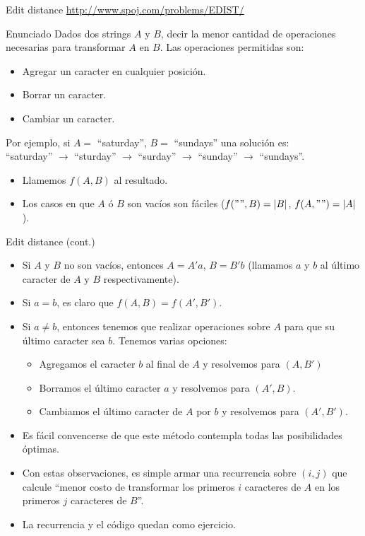 \documentclass{beamer}
\begin{document}
\begin{frame}{Edit distance}
\url{http://www.spoj.com/problems/EDIST/}
\begin{block}{Enunciado}
Dados dos strings $A$ y $B$, decir la menor cantidad de operaciones necesarias para transformar $A$ en $B$. Las operaciones permitidas son:
\begin{itemize}
\item
Agregar un caracter en cualquier posici\'on.
\item
Borrar un caracter.
\item
Cambiar un caracter.
\end{itemize}
Por ejemplo, si $A =$ ``saturday'', $B =$ ``sundays'' una soluci\'on es:\\
``saturday'' $\rightarrow$ ``sturday'' $\rightarrow$ ``surday''  $\rightarrow$ ``sunday'' $\rightarrow$ ``sundays''.
\end{block}
\begin{itemize}
\item
Llamemos $f(A,B)$ al resultado.
\item
Los casos en que $A$ \'o $B$ son vac\'ios son f\'aciles ($f("",B) = |B|$, $f(A,"") = |A|$).
\end{itemize}
\end{frame}
\begin{frame}{Edit distance (cont.)}
\begin{itemize}
\item
Si $A$ y $B$ no son vac\'ios, entonces $A = A'a$, $B = B'b$ (llamamos $a$ y $b$ al \'ultimo caracter de $A$ y $B$ respectivamente).
\item
Si $a = b$, es claro que $f(A,B) = f(A',B')$.
\item
Si $a \neq b$, entonces tenemos que realizar operaciones sobre $A$ para que su \'ultimo caracter sea $b$. Tenemos varias opciones:
\begin{itemize}
\item
Agregamos el caracter $b$ al final de $A$ y resolvemos para $(A,B')$
\item
Borramos el \'ultimo caracter $a$ y resolvemos para $(A',B)$.
\item
Cambiamos el \'ultimo caracter de $A$ por $b$ y resolvemos para $(A',B')$.
\end{itemize}
\item
Es f\'acil convencerse de que este m\'etodo contempla todas las posibilidades \'optimas.
\item
Con estas observaciones, es simple armar una recurrencia sobre $(i,j)$ que calcule ``menor costo de transformar los primeros $i$ caracteres de $A$ en los primeros $j$ caracteres de $B$''.
\item
La recurrencia y el c\'odigo quedan como ejercicio.
\end{itemize}
\end{frame}
\end{document}
